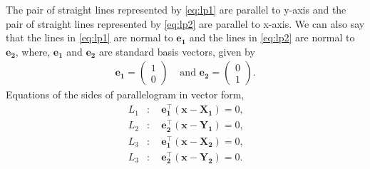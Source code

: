 \documentclass[journal,12pt,twocolumn]{IEEEtran}
\let\vec\mathbf
\newcommand{\myvec}[1]{\ensuremath{\begin{pmatrix}#1\end{pmatrix}}}
\providecommand{\brak}[1]{\ensuremath{\left(#1\right)}}
\begin{document}

The pair of straight lines represented by \eqref{eq:lp1} are parallel to y-axis and the pair of straight lines represented by \eqref{eq:lp2} are parallel to x-axis.
We can also say that the lines in \eqref{eq:lp1} are normal to $\vec{e_1}$ and the lines in \eqref{eq:lp2} are normal to $\vec{e_2}$,  
where, $\vec{e_1}$ and $\vec{e_2}$ are standard basis vectors, given by
\begin{align*}
		\vec{e_1} = \myvec{1\\0} &\text{ and   }
		\vec{e_2} = \myvec{0\\1} \text{.} 
\end{align*}
Equations of the sides of parallelogram in vector form,  
\begin{align}
		L_1 &\colon \quad \vec{e_1^{\top}}\brak{{\vec{x}-\vec{X_1}}} = 0\text{,} \label{eq:line_1}\\
		L_2 &\colon \quad \vec{e_2^{\top}}\brak{{\vec{x}-\vec{Y_1}}} = 0\text{,} \label{eq:line_2}\\
		L_3 &\colon \quad \vec{e_1^{\top}}\brak{{\vec{x}-\vec{X_2}}} = 0\text{,} \label{eq:line_3}\\
		L_3 &\colon \quad \vec{e_2^{\top}}\brak{{\vec{x}-\vec{Y_2}}} = 0\text{.} \label{eq:line_4}
\end{align}
\end{document}
